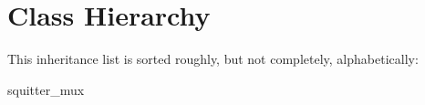 \section{Class Hierarchy}
This inheritance list is sorted roughly, but not completely, alphabetically\+:\begin{DoxyCompactList}
\item {}
\item squitter\+\_\+mux\begin{DoxyCompactList}
\item {}
\end{DoxyCompactList}
\end{DoxyCompactList}
